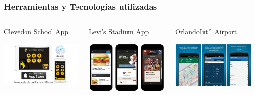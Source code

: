 \begin{frame}
	\frametitle{Herramientas y Tecnologías utilizadas}
		\begin{columns}
			\begin{column}{0.3\textwidth}
				Clevedon School App
				\vspace{3mm}
				\vfill 
					\begin{center}
						\includegraphics[width=0.8\linewidth]{Images/ClevedonApp}
					\end{center}
			\end{column}
			\begin{column}{0.3\textwidth}
				Levi's Stadium App
				\vspace{3mm}
				\vfill 
					\begin{center}
						\includegraphics[width=0.8\linewidth]{Images/LevisStadium}
					\end{center}
			\end{column}
			\begin{column}{0.3\textwidth}
				OrlandoInt'l Airport
				\vspace{3mm}
				\vfill 
					\begin{center}
						\includegraphics[width=0.8\linewidth]{Images/orlandoAirport}

\end{center}
\end{column}
\end{columns}
\end{frame}
